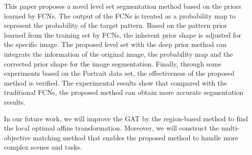 This paper proposes a novel level set segmentation method based on the priors learned by FCNs. The output of the FCNs is treated as a probability map to represent the probability of the target pattern. Based on the pattern prior learned from the training set by FCNs, the inherent prior shape is adjusted for the specific image. The proposed level set with the deep prior method can integrate the information of the original image, the probability map and the corrected prior shape for the image segmentation. Finally, through some experiments based on the Portrait data set, the effectiveness of the proposed method is verified. The experimental results show that compared with the traditional FCNs, the proposed method can obtain more accurate segmentation results.

In our future work, we will improve the GAT by the region-based method to find the local optimal affine transformation. Moreover,  we will construct the multi-objective matching method that enables the proposed method to handle more complex scenes and tasks.
